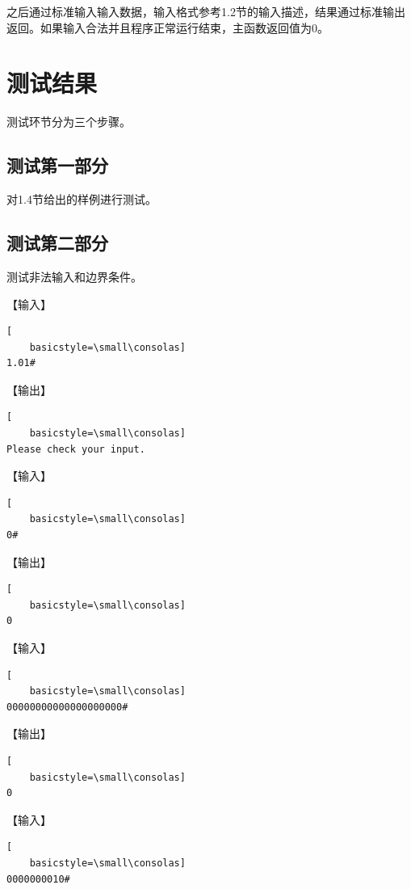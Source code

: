 \documentclass{article}
\begin{document}
之后通过标准输入输入数据，输入格式参考1.2节的输入描述，结果通过标准输出返回。如果输入合法并且程序正常运行结束，主函数返回值为0。

\section{测试结果}

测试环节分为三个步骤。

\subsection{测试第一部分}

对1.4节给出的样例进行测试。

\subsection{测试第二部分}

测试非法输入和边界条件。

【输入】

\begin{lstlisting}[
    basicstyle=\small\consolas]
1.01#
\end{lstlisting}

【输出】

\begin{lstlisting}[
    basicstyle=\small\consolas]
Please check your input.
\end{lstlisting}

【输入】

\begin{lstlisting}[
    basicstyle=\small\consolas]
0#
\end{lstlisting}

【输出】

\begin{lstlisting}[
    basicstyle=\small\consolas]
0
\end{lstlisting}

【输入】

\begin{lstlisting}[
    basicstyle=\small\consolas]
00000000000000000000#
\end{lstlisting}

【输出】

\begin{lstlisting}[
    basicstyle=\small\consolas]
0
\end{lstlisting}

【输入】

\begin{lstlisting}[
    basicstyle=\small\consolas]
0000000010#
\end{lstlisting}
\end{document}
